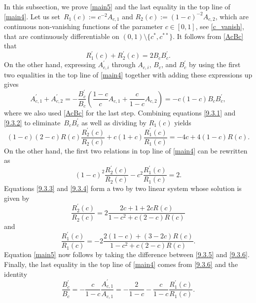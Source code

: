 \documentclass[10pt,a4paper]{amsart}
\numberwithin{equation}{section}
\begin{document}
In this subsection, we prove \eqref{main5} and the last equality in the top line of \eqref{main4}. Let us set~${ R_1(c) := c^{-2}A_{c,1}} $ and $ R_2(c) := (1-c)^{-2}A_{c,2} $, which are continuous non-vanishing functions of the parameter $ c\in[0,1] $, see \eqref{c_vanish}, that are continuously differentiable on $ (0,1)\setminus\{c^*,c^{**}\}$. It follows from \eqref{AcBc} that
\begin{equation}
\label{9.3.1}
R_1^\prime(c) + R_2^\prime(c) = 2B_cB_c^\prime.
\end{equation}
On the other hand, expressing $ A_{c,i}^\prime $ through $ A_{c,i} $, $ B_c $, and $B_c^\prime $ by using the first two equalities in the top line of \eqref{main4} together with adding these expressions up gives
\begin{equation}
\label{9.3.2}
A_{c,1}^\prime + A_{c,2}^\prime = -\frac{B_c^\prime}{B_c}\left( \frac{1-c}c A_{c,1} + \frac c{1-c} A_{c,2} \right) = -c(1-c) B_c B_c^\prime,
\end{equation}
where we also used \eqref{AcBc} for the last step. Combining equations \eqref{9.3.1} and \eqref{9.3.2} to eliminate~$ B_cB_c^\prime $ as well as dividing by $ R_1(c) $ yields
\begin{equation}
\label{9.3.3}
(1-c)(2-c)R(c)\frac{R_2^\prime(c)}{R_2(c)} + c(1+c)\frac{R_1^\prime(c)}{R_1(c)} = -4c + 4(1-c)R(c).
\end{equation}
On the other hand, the first two relations in top line of \eqref{main4} can be rewritten as
\begin{equation}
\label{9.3.4}
(1-c)^2\frac{R_2^\prime(c)}{R_2(c)} - c^2\frac{R_1^\prime(c)}{R_1(c)} = 2.
\end{equation}
Equations \eqref{9.3.3} and \eqref{9.3.4} form a two by two linear system whose solution is given by
\begin{equation}
\label{9.3.5}
\frac{R_2^\prime(c)}{R_2(c)} = 2\frac{2c+1+2cR(c)}{1-c^2+c(2-c)R(c)}
\end{equation}
and
\begin{equation}
\label{9.3.6}
\frac{R_1^\prime(c)}{R_1(c)} = -2\frac{2(1-c)+(3-2c)R(c)}{1-c^2+c(2-c)R(c)}.
\end{equation}
Equation \eqref{main5} now follows by taking the difference between \eqref{9.3.5} and \eqref{9.3.6}. Finally, the last equality in the top line of \eqref{main4} comes from \eqref{9.3.6} and the identity
\[
\frac{B_c^\prime}{B_c} = -\frac c{1-c} \frac{A_{c,1}^\prime}{A_{c,1}} = -\frac2{1-c} - \frac c{1-c}\frac{R_1^\prime(c)}{R_1(c)}.
\]
\end{document}

